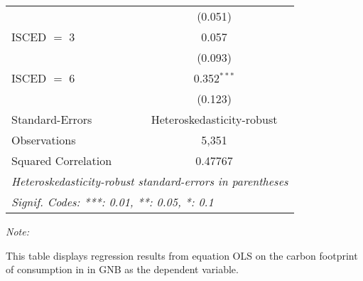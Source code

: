 \begin{table}[htbp!]
\begin{adjustbox}{width = 1\textwidth, max height = 0.95\textheight, center}
\begin{threeparttable}[b]
\begin{tabular}{lc}
                                & (0.051)\\   
            ISCED $=$ 3         & 0.057\\   
                                & (0.093)\\   
            ISCED $=$ 6         & 0.352$^{***}$\\   
                                & (0.123)\\   
            \midrule 
            Standard-Errors     & Heteroskedasticity-robust \\   
            Observations        & 5,351\\  
            Squared Correlation & 0.47767\\  
            \midrule \midrule
            \multicolumn{2}{l}{\emph{Heteroskedasticity-robust standard-errors in parentheses}}\\
            \multicolumn{2}{l}{\emph{Signif. Codes: ***: 0.01, **: 0.05, *: 0.1}}\\
         \end{tabular}
         
         \begin{tablenotes}\item \medskip \textit{Note:}
            \item This table displays regression results from equation OLS on the carbon footprint of consumption in  in GNB as the dependent variable.  
         \end{tablenotes}
      \end{threeparttable}
   \end{adjustbox}
\end{table}



